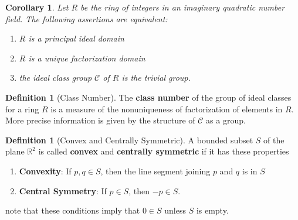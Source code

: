 \documentclass[12pt]{article}
\newtheorem{cor}[thm]{Corollary}
\theoremstyle{definition}
\newtheorem{defn}[thm]{Definition}
\theoremstyle{remark}
\numberwithin{equation}{section}
\newcommand\R{\mathbb R}    %
\newcommand\B[1]{\textbf{ #1}}
\begin{document}
\vspace{15pt}

\begin{cor}
        Let $R$ be the ring of integers in an imaginary quadratic number field. The following assertions are equivalent:\begin{enumerate}
                \item $R$ is a principal ideal domain
                \item $R$ is a unique factorization domain
                \item the ideal class group $\mathcal{C}$ of $R$ is the trivial group.
        \end{enumerate}
\end{cor}


\vspace{15pt}

\begin{defn}[Class Number]
        The \B{class number} of the group of ideal classes for a ring $R$ is a measure of the nonuniqueness of factorization of elements in $R$. More precise information is given by the structure of $\mathcal{C}$ as a group. 
\end{defn}

\vspace{15pt}

\begin{defn}[Convex and Centrally Symmetric]
        A bounded subset $S$ of the plane $\R^2$ is called \B{convex} and \B{centrally symmetric} if it has these properties \begin{enumerate}
                \item \B{Convexity}: If $p,q \in S$, then the line segment joining $p$ and $q$ is in $S$
                \item \B{Central Symmetry}: If $p \in S$, then $-p \in S$.
        \end{enumerate}
        note that these conditions imply that $0 \in S$ unless $S$ is empty.
\end{defn}

\vspace{15pt}
\end{document}
